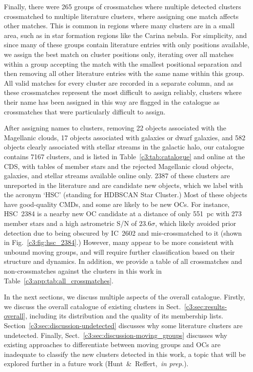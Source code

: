 Finally, there were 265 groups of crossmatches where multiple detected clusters crossmatched to multiple literature clusters, where assigning one match affects other matches. This is common in regions where many clusters are in a small area, such as in star formation regions like the Carina nebula. For simplicity, and since many of these groups contain literature entries with only positions available, we assign the best match on cluster positions only, iterating over all matches within a group accepting the match with the smallest positional separation and then removing all other literature entries with the same name within this group. All valid matches for every cluster are recorded in a separate column, and as these crossmatches represent the most difficult to assign reliably, clusters where their name has been assigned in this way are flagged in the catalogue as crossmatches that were particularly difficult to assign.

After assigning names to clusters, removing 22 objects associated with the Magellanic clouds, 17 objects associated with galaxies or dwarf galaxies, and 582 objects clearly associated with stellar streams in the galactic halo, our catalogue contains 7167 clusters, and is listed in Table~\ref{c3:tab:catalogue} and online at the CDS, with tables of member stars and the rejected Magellanic cloud objects, galaxies, and stellar streams available online only. 2387 of these clusters are unreported in the literature and are candidate new objects, which we label with the acronym `HSC' (standing for HDBSCAN Star Cluster.) Most of these objects have good-quality CMDs, and some are likely to be new OCs. For instance, HSC~2384 is a nearby new OC candidate at a distance of only 551~pc with 273 member stars and a high astrometric S/N of $23.6\sigma$, which likely avoided prior detection due to being obscured by IC~2602 and mis-crossmatched to it (shown in Fig.~\ref{c3:fig:hsc_2384}.) However, many appear to be more consistent with unbound moving groups, and will require further classification based on their structure and dynamics. In addition, we provide a table of all crossmatches and non-crossmatches against the clusters in this work in Table~\ref{c3:app:tab:all_crossmatches}.

In the next sections, we discuss multiple aspects of the overall catalogue. Firstly, we discuss the overall catalogue of existing clusters in Sect.~\ref{c3:sec:results-overall}, including its distribution and the quality of its membership lists. Section~\ref{c3:sec:discussion-undetected} discusses why some literature clusters are undetected. Finally, Sect.~\ref{c3:sec:discussion-moving_groups} discusses why existing approaches to differentiate between moving groups and OCs are inadequate to classify the new clusters detected in this work, a topic that will be explored further in a future work (Hunt~\&~Reffert,~\emph{in prep.}).



